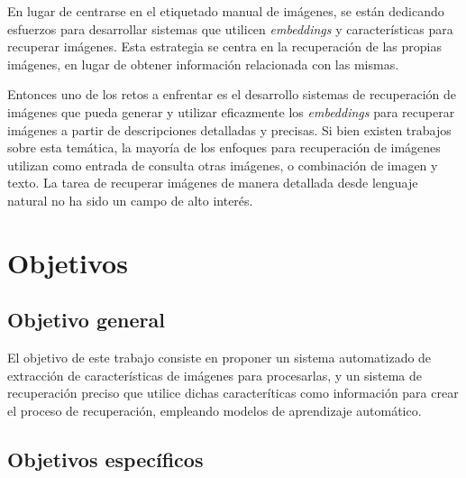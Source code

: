 En lugar de centrarse en el etiquetado manual de imágenes, se están dedicando esfuerzos para desarrollar sistemas que utilicen \textit{embeddings} y características para recuperar imágenes. Esta estrategia se centra en la recuperación de las propias imágenes, en lugar de obtener información relacionada con las mismas.

Entonces uno de los retos a enfrentar es el desarrollo sistemas de recuperación de imágenes que pueda generar y utilizar eficazmente los \textit{embeddings} para recuperar imágenes a partir de descripciones detalladas y precisas. Si bien existen trabajos sobre esta tem\'atica, la mayor\'ia de los enfoques para recuperaci\'on de im\'agenes utilizan como entrada de consulta otras im\'agenes, o combinaci\'on de imagen y texto. La tarea de recuperar im\'agenes de manera detallada desde lenguaje natural no ha sido un campo de alto inter\'es.

\section*{Objetivos}

\subsection*{Objetivo general}

El objetivo de este trabajo consiste en proponer un sistema automatizado de extracci\'on de caracter\'isticas de im\'agenes para procesarlas, y un sistema de recuperaci\'on preciso que utilice dichas caracter\'iticas como informaci\'on para crear el proceso de recuperaci\'on, empleando modelos de aprendizaje autom\'atico.


\subsection*{Objetivos espec\'ificos}

